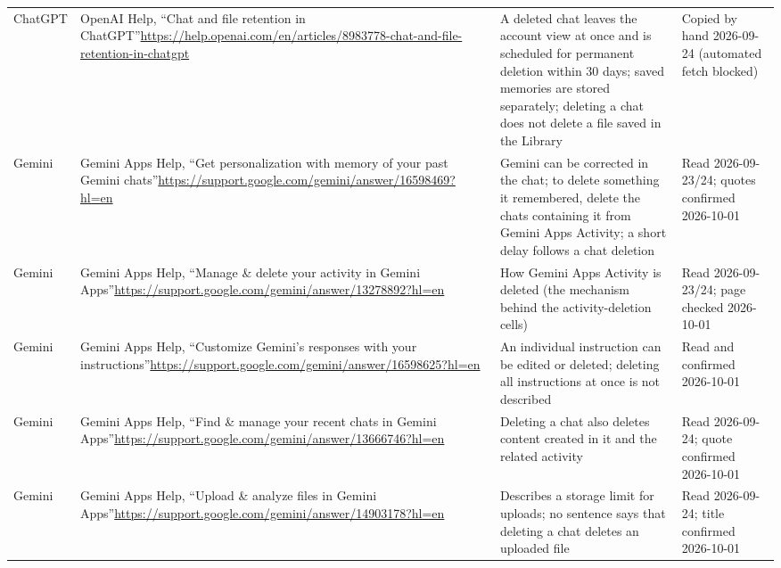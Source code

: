 \documentclass[conference,compsoc]{IEEEtran}
\begin{document}
\begin{table}[t]
\begin{tabular}{@{}p{}p{}p{}p{}@{}}
ChatGPT & OpenAI Help, ``Chat and file retention in ChatGPT''\newline\url{https://help.openai.com/en/articles/8983778-chat-and-file-retention-in-chatgpt} & A deleted chat leaves the account view at once and is scheduled for permanent deletion within 30 days; saved memories are stored separately; deleting a chat does not delete a file saved in the Library & Copied by hand 2026-09-24 (automated fetch blocked) \\
Gemini & Gemini Apps Help, ``Get personalization with memory of your past Gemini chats''\newline\url{https://support.google.com/gemini/answer/16598469?hl=en} & Gemini can be corrected in the chat; to delete something it remembered, delete the chats containing it from Gemini Apps Activity; a short delay follows a chat deletion & Read 2026-09-23/24; quotes confirmed 2026-10-01 \\
Gemini & Gemini Apps Help, ``Manage \& delete your activity in Gemini Apps''\newline\url{https://support.google.com/gemini/answer/13278892?hl=en} & How Gemini Apps Activity is deleted (the mechanism behind the activity-deletion cells) & Read 2026-09-23/24; page checked 2026-10-01 \\
Gemini & Gemini Apps Help, ``Customize Gemini's responses with your instructions''\newline\url{https://support.google.com/gemini/answer/16598625?hl=en} & An individual instruction can be edited or deleted; deleting all instructions at once is not described & Read and confirmed 2026-10-01 \\
Gemini & Gemini Apps Help, ``Find \& manage your recent chats in Gemini Apps''\newline\url{https://support.google.com/gemini/answer/13666746?hl=en} & Deleting a chat also deletes content created in it and the related activity & Read 2026-09-24; quote confirmed 2026-10-01 \\
Gemini & Gemini Apps Help, ``Upload \& analyze files in Gemini Apps''\newline\url{https://support.google.com/gemini/answer/14903178?hl=en} & Describes a storage limit for uploads; no sentence says that deleting a chat deletes an uploaded file & Read 2026-09-24; title confirmed 2026-10-01 \\
\bottomrule
\end{tabular}
\end{table}
\end{document}

